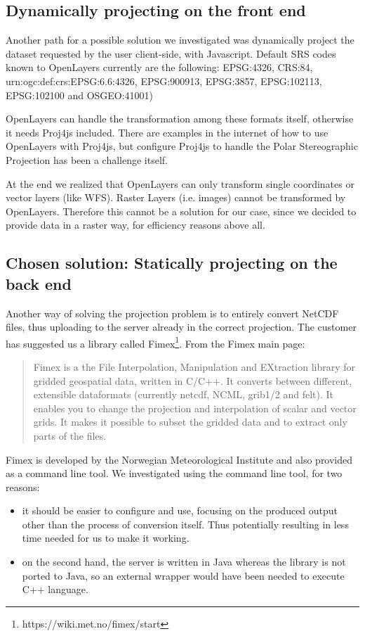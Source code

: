\documentclass[11pt,a4paper,titlepage,oneside]{report}
\begin{document}
\subsection{Dynamically projecting on the front end}
Another path for a possible solution we investigated was dynamically project the dataset requested by the user client-side, with Javascript. 
Default SRS codes known to OpenLayers currently are the following:
EPSG:4326, CRS:84, urn:ogc:def:crs:EPSG:6.6:4326, EPSG:900913, EPSG:3857, EPSG:102113, EPSG:102100 and OSGEO:41001)

OpenLayers can handle the transformation among these formats itself, otherwise it needs Proj4js included.
There are examples in the internet of how to use OpenLayers with Proj4js, but configure Proj4js to handle the Polar Stereographic Projection has been a challenge itself.

At the end we realized that OpenLayers can only transform single coordinates or vector layers (like \gls{WFS}). Raster Layers (i.e. images) cannot be transformed by OpenLayers. Therefore this cannot be a solution for our case, since we decided to provide data in a raster way, for efficiency reasons above all.

\subsection{Chosen solution: Statically projecting on the back end}
Another way of solving the projection problem is to entirely convert NetCDF files, thus uploading to the server already in the correct projection.
The customer has suggested us a library called \gls{Fimex}\footnote{https://wiki.met.no/fimex/start}.
From the Fimex main page:
\begin{quote}
Fimex is a the File Interpolation, Manipulation and EXtraction library for gridded geospatial data, written in C/C++. It converts between different, extensible dataformats (currently \gls{netcdf}, \gls{NCML}, grib1/2 and felt). It enables you to change the projection and interpolation of scalar and vector grids. It makes it possible to subset the gridded data and to extract only parts of the files.
\end{quote}
Fimex is developed by the Norwegian Meteorological Institute and also provided as a command line tool. 
We investigated using the command line tool, for two reasons:
\begin{itemize}
\item it should be easier to configure and use, focusing on the produced output other than the process of conversion itself. Thus potentially resulting in less time needed for us to make it working.
\item on the second hand, the server is written in Java whereas the library is not ported to Java, so an external wrapper would have been needed to execute C++ language.
\end{itemize}
\end{document}
